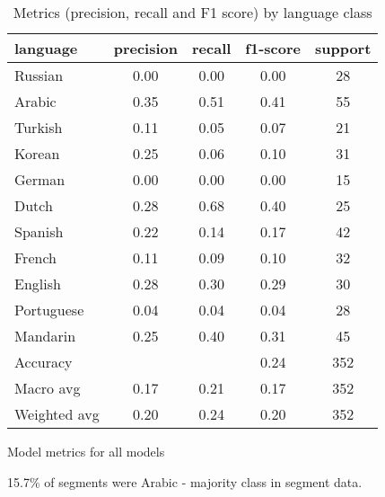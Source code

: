 \documentclass[11pt, letterpaper]{article}
\begin{document}
\begin{table}
\begin{center}
\caption{Metrics (precision, recall and F1 score) by language class}
\begin{tabular}{l c c c c}
language  &   precision &   recall  &f1-score &  support \\ \hline

Russian	&  0.00    &  0.00   &   0.00    &    28  \\
Arabic    &   0.35    &  0.51   &   0.41    &    55\\ 
Turkish    &   0.11    &  0.05   &   0.07    &    21\\
Korean    &   0.25   &   0.06  &    0.10   &     31\\
German  &     0.00 &     0.00  &    0.00  &      15\\
Dutch    &   0.28   &   0.68   &   0.40    &    25\\
Spanish  &     0.22 &     0.14   &   0.17  &      42\\
French   &    0.11   &   0.09    &  0.10    &    32\\
English   &    0.28  &    0.30   &   0.29   &     30\\
Portuguese &      0.04  &    0.04  &    0.04   &     28\\
Mandarin   &    0.25    &  0.40   &   0.31    &    45\\ \hline

Accuracy      &         &         &   0.24  &     352\\
Macro avg     &  0.17   &   0.21    &  0.17     &  352\\
Weighted avg    &   0.20    &  0.24     & 0.20     &  352\\ \hline
\end{tabular}
\end{center}
\end{table}



Model metrics for all models

15.7\% of segments were Arabic - majority class in segment data.
\end{document}
